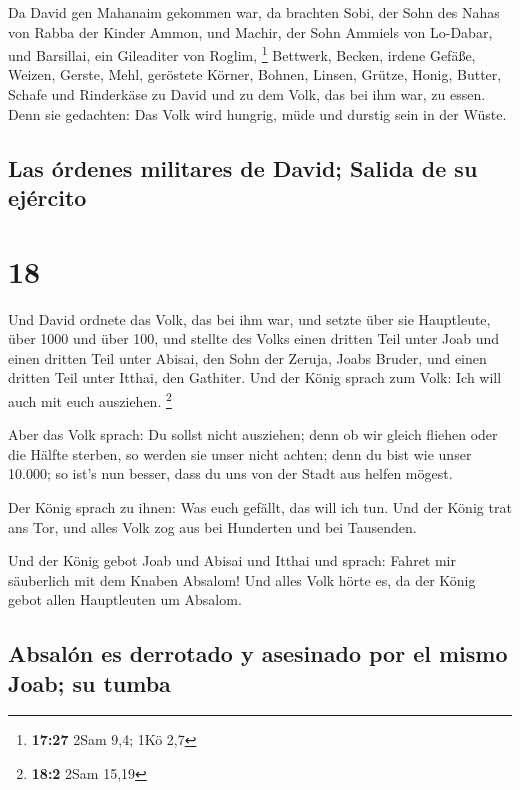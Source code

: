  Da David gen Mahanaim gekommen war, da brachten Sobi,
der Sohn des Nahas von Rabba der Kinder Ammon, und Machir, der Sohn
Ammiels von Lo-Dabar, und Barsillai, ein Gileaditer von Roglim,
\footnote{\textbf{17:27} 2Sam 9,4; 1Kö 2,7}  Bettwerk,
Becken, irdene Gefäße, Weizen, Gerste, Mehl, geröstete Körner, Bohnen,
Linsen, Grütze,  Honig, Butter, Schafe und Rinderkäse zu
David und zu dem Volk, das bei ihm war, zu essen. Denn sie gedachten:
Das Volk wird hungrig, müde und durstig sein in der Wüste.

\hypertarget{las-uxf3rdenes-militares-de-david-salida-de-su-ejuxe9rcito}{%
\subsection{Las órdenes militares de David; Salida de su
ejército}\label{las-uxf3rdenes-militares-de-david-salida-de-su-ejuxe9rcito}}

\hypertarget{section-17}{%
\section{18}\label{section-17}}

 Und David ordnete das Volk, das bei ihm war, und setzte
über sie Hauptleute, über 1000 und über 100,  und stellte
des Volks einen dritten Teil unter Joab und einen dritten Teil unter
Abisai, den Sohn der Zeruja, Joabs Bruder, und einen dritten Teil unter
Itthai, den Gathiter. Und der König sprach zum Volk: Ich will auch mit
euch ausziehen. \footnote{\textbf{18:2} 2Sam 15,19}

 Aber das Volk sprach: Du sollst nicht ausziehen; denn ob
wir gleich fliehen oder die Hälfte sterben, so werden sie unser nicht
achten; denn du bist wie unser 10.000; so ist's nun besser, dass du uns
von der Stadt aus helfen mögest.

 Der König sprach zu ihnen: Was euch gefällt, das will ich
tun. Und der König trat ans Tor, und alles Volk zog aus bei Hunderten
und bei Tausenden.

 Und der König gebot Joab und Abisai und Itthai und
sprach: Fahret mir säuberlich mit dem Knaben Absalom! Und alles Volk
hörte es, da der König gebot allen Hauptleuten um Absalom.

\hypertarget{absaluxf3n-es-derrotado-y-asesinado-por-el-mismo-joab-su-tumba}{%
\subsection{Absalón es derrotado y asesinado por el mismo Joab; su
tumba}\label{absaluxf3n-es-derrotado-y-asesinado-por-el-mismo-joab-su-tumba}}

